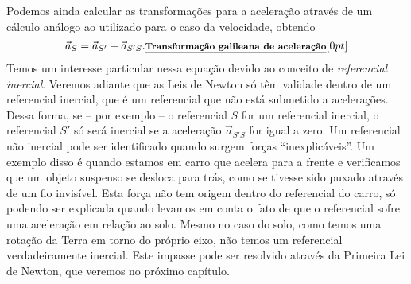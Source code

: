 Podemos ainda calcular as transformações para a aceleração através de um cálculo análogo ao utilizado para o caso da velocidade, obtendo
\begin{equation}
  \vec{a}_S = \vec{a}_{S'} + \vec{a}_{S'S}.  \relax{\footnotesize\emph{\textbf{Transformação galileana de aceleração}}}[0pt]
\end{equation}
%
Temos um interesse particular nessa equação devido ao conceito de \emph{referencial inercial}. Veremos adiante que as Leis de Newton só têm validade dentro de um referencial inercial, que é um referencial que não está submetido a acelerações. Dessa forma, se -- por exemplo -- o referencial $S$ for um referencial inercial, o referencial $S'$ só será inercial se a aceleração $\vec{a}_{S'S}$ for igual a zero. Um referencial não inercial pode ser identificado quando surgem forças ``inexplicáveis''. Um exemplo disso é quando estamos em carro que acelera para a frente e verificamos que um objeto suspenso se desloca para trás, como se tivesse sido puxado através de um fio invisível. Esta força não tem origem dentro do referencial do carro, só podendo ser explicada quando levamos em conta o fato de que o referencial sofre uma aceleração em relação ao solo. Mesmo no caso do solo, como temos uma rotação da Terra em torno do próprio eixo, não temos um referencial verdadeiramente inercial. Este impasse pode ser resolvido através da Primeira Lei de Newton, que veremos no próximo capítulo.



